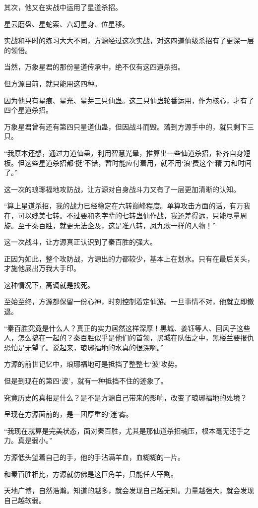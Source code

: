 \begin{this_body}
其次，他又在实战中运用了星道杀招。

星云磨盘、星蛇索、六幻星身、位星移。

实战和平时的练习大大不同，方源经过这次实战，对这四道仙级杀招有了更深一层的领悟。

当然，万象星君的那份星道传承中，绝不仅有这四道杀招。

但方源目前，就只能用这四种。

因为他只有星痕、星光、星芽三只仙蛊。这三只仙蛊轮番运用，作为核心，才有了四个星道杀招。

万象星君曾有还有第四只星道仙蛊，但因战斗而毁。落到方源手中的，就只剩下三只。

“我原本还想，通过力道仙蛊，利用智慧光晕，推算出一些仙道杀招，补齐自身短板。但这些星道杀招都‘挺’不错，暂时能应付着用，就不用‘浪’费这个‘精’力和时间了。”

这一次的琅琊福地攻防战，让方源对自身战斗力又有了一层更加清晰的认知。

“算上星道杀招，我的战力已经稳定在六转巅峰程度。单算攻击方面的话，有万我在，可以媲美七转。不过要和老字辈的七转蛊仙作战，我还差得远，只能尽量周旋。至于秦百胜，就更无法企及，这是准八转，凤九歌一样的人物！”

这一次战斗，让方源真正认识到了秦百胜的强大。

正因为如此，整个攻防战，方源出的力都较少，基本上在划水。只有在最后关头，才施他展出万我大手印。

这种情况下，高调就是找死。

至始至终，方源都保留一份心神，时刻控制着定仙游。一旦事情不对，他就立即撤退。

“秦百胜究竟是什么人？真正的实力居然这样深厚！黑城、姜钰等人、回风子这些人，怎么搞在一起的？秦百胜似乎是他们的首领，黑城在队伍之中，黑楼兰要报仇恐怕是无望了。说起来，琅琊福地的水真的很深啊。”

方源的前世记忆中，琅琊福地可是抵挡了整整七‘波’攻势。

但是到现在的第四‘波’，就有一种抵挡不住的迹象了。

究竟历史的真相是什么？是不是方源自己带来的影响，改变了琅琊福地的处境？

呈现在方源面前的，是一团厚重的‘迷’雾。

“我现在就算是完美状态，面对秦百胜，尤其是那仙道杀招魂压，根本毫无还手之力。真是弱小。”

方源低头望着自己的手，他的手沾满羊血，血糊糊的一片。

和秦百胜相比，方源就仿佛是这巨角羊，只能任人宰割。

天地广博，自然浩瀚。知道的越多，就会发现自己越无知。力量越强大，就会发现自己越软弱。


\end{this_body}
